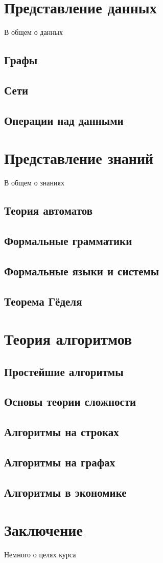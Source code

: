 \documentclass[b5paper,11pt]{book}
\begin{document}
	
	\chapter{Представление данных}
	В общем о данных
	
	\section{Графы}
	
	\section{Сети}
	
	\section{Операции над данными}
	
	\chapter{Представление знаний}
	В общем о знаниях
	
	\section{Теория автоматов}
	\section{Формальные грамматики}
	\section{Формальные языки и системы}
	\section{Теорема Гёделя}
	
	\chapter{Теория алгоритмов}
	
	\section{Простейшие алгоритмы}
	\section{Основы теории сложности}
	\section{Алгоритмы на строках}
	\section{Алгоритмы на графах}
	\section{Алгоритмы в экономике}
	
	
	\chapter*{Заключение}
	Немного о целях курса
	\printbibliography
\end{document}
